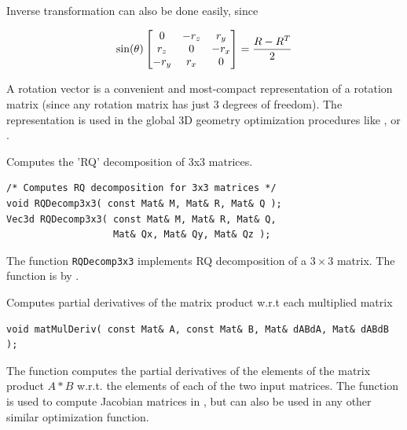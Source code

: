 Inverse transformation can also be done easily, since

\[
\sin(\theta)
\begin{bmatrix} 0 & -r_z & r_y\\ r_z & 0 & -r_x\\ -r_y & r_x & 0 \end{bmatrix}
=
\frac{R - R^T}{2}
\]

A rotation vector is a convenient and most-compact representation of a rotation matrix
(since any rotation matrix has just 3 degrees of freedom). The representation is
used in the global 3D geometry optimization procedures like ,  or .


\label{RQDecomp3x3}
Computes the 'RQ' decomposition of 3x3 matrices.

\begin{lstlisting}
/* Computes RQ decomposition for 3x3 matrices */
void RQDecomp3x3( const Mat& M, Mat& R, Mat& Q );
Vec3d RQDecomp3x3( const Mat& M, Mat& R, Mat& Q,
                   Mat& Qx, Mat& Qy, Mat& Qz );
\end{lstlisting}
\begin{description}
\end{description}

The function \texttt{RQDecomp3x3} implements RQ decomposition of a $3 \times 3$ matrix. The function is by .

\label{matMulDeriv}
Computes partial derivatives of the matrix product w.r.t each multiplied matrix

\begin{lstlisting}
void matMulDeriv( const Mat& A, const Mat& B, Mat& dABdA, Mat& dABdB );
\end{lstlisting}
\begin{description}
\end{description}

The function computes the partial derivatives of the elements of the matrix product $A*B$ w.r.t. the elements of each of the two input matrices. The function is used to compute Jacobian matrices in , but can also be used in any other similar optimization function.

